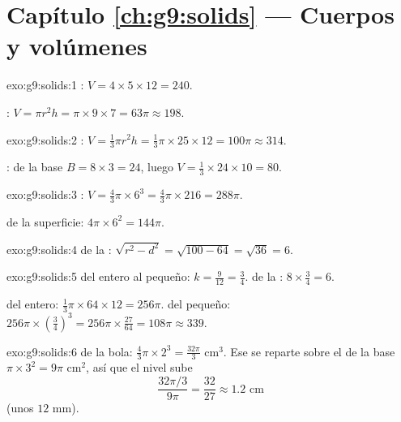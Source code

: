 \section*{Capítulo \ref{ch:g9:solids} --- Cuerpos y volúmenes}

\begin{solution}{exo:g9:solids:1}
: $V = 4 \times 5 \times 12 = 240$.

: $V = \pi r^2 h = \pi \times 9 \times 7 = 63\pi \approx 198$.
\end{solution}

\begin{solution}{exo:g9:solids:2}
: $V = \frac13 \pi r^2 h = \frac13 \pi \times 25 \times 12 =
100\pi \approx 314$.

:  de la base $B = 8 \times 3 = 24$, luego
$V = \frac13 \times 24 \times 10 = 80$.
\end{solution}

\begin{solution}{exo:g9:solids:3}
: $V = \frac43 \pi \times 6^3 = \frac43 \pi \times 216 = 288\pi$.

 de la superficie: $4\pi \times 6^2 = 144\pi$.
\end{solution}

\begin{solution}{exo:g9:solids:4}
 de la : $\sqrt{r^2 - d^2} = \sqrt{100 - 64} = \sqrt{36}
= 6$.
\end{solution}

\begin{solution}{exo:g9:solids:5}
 del  entero al pequeño:
$k = \frac{9}{12} = \frac34$.  de la : $8 \times \frac34 = 6$.

 del  entero: $\frac13\pi \times 64 \times 12 = 256\pi$.
 del  pequeño: $256\pi \times \left(\frac34\right)^3 =
256\pi \times \frac{27}{64} = 108\pi \approx 339$.
\end{solution}

\begin{solution}{exo:g9:solids:6}
 de la bola: $\frac43\pi \times 2^3 = \frac{32\pi}{3}$ cm$^3$.
Ese  se reparte sobre el  de la base $\pi \times 3^2 = 9\pi$ cm$^2$,
así que el nivel sube
\[
\frac{32\pi/3}{9\pi} = \frac{32}{27} \approx 1.2 \text{ cm}
\]
(unos $12$ mm).
\end{solution}

